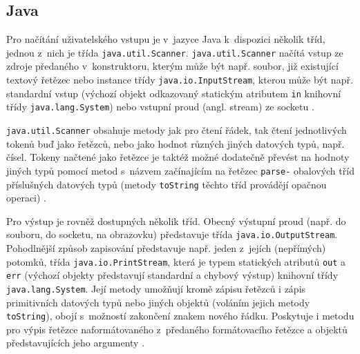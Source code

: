 \documentclass{bakalarka}
\begin{document}
\subsection{Java}
Pro načítání uživatelského vstupu je v~jazyce Java k~dispozici několik tříd, jednou z~nich je třída \texttt{java.util.Scanner}. \texttt{java.util.Scanner} načítá vstup ze zdroje předaného v~konstruktoru, kterým může být např. soubor, již existující textový řetězec nebo instance třídy \texttt{java.io.InputStream}, kterou může být např. standardní vstup (výchozí objekt odkazovaný statickým atributem \texttt{in} knihovní třídy \texttt{java.lang.System}) nebo vstupní proud (angl. stream) ze socketu \cite{java-guide-scanner, java-guide-inputstream, java-guide-system}.\par
\texttt{java.util.Scanner} obsahuje metody jak pro čtení řádek, tak čtení jednotlivých tokenů buď jako řetězců, nebo jako hodnot různých jiných datových typů, např. čísel. Tokeny načtené jako řetězce je taktéž možné dodatečně převést na hodnoty jiných typů pomocí metod s~názvem začínajícím na řetězec \texttt{parse-} obalových tříd příslušných datových typů (metody \texttt{toString} těchto tříd provádějí opačnou operaci) \cite{java-guide-scanner, java-guide-byte, java-guide-short, java-guide-integer, java-guide-long, java-guide-float, java-guide-double, java-guide-boolean, java-guide-character}.\par
Pro výstup je rovněž dostupných několik tříd. Obecný výstupní proud (např. do souboru, do socketu, na obrazovku) představuje třída \texttt{java.io\-.OutputStream}. Pohodlnější způsob zapisování představuje např. jeden z~jejích (nepřímých) potomků, třída \texttt{java.io.PrintStream}, která je typem statických atributů \texttt{out} a \texttt{err} (výchozí objekty představují standardní a chybový výstup) knihovní třídy \texttt{java.lang.System}. Její metody umožňují kromě zápisu řetězců i zápis primitivních datových typů nebo jiných objektů (voláním jejich metody \texttt{toString}), obojí s~možností zakončení znakem nového řádku. Poskytuje i metodu pro výpis řetězce naformátovaného z~předaného formátovacího řetězce a objektů představujících jeho argumenty \cite{java-guide-outputstream, java-guide-printstream, java-guide-system}.
\end{document}
